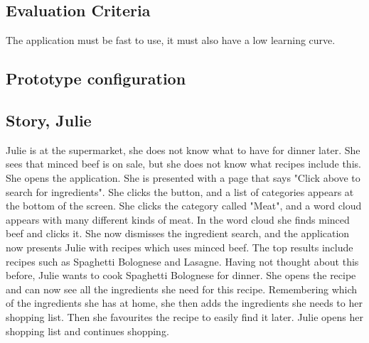 \subsection*{Evaluation Criteria}

The application must be fast to use, it must also have a low learning curve.

\subsection*{Prototype configuration}

\subsection*{Story, Julie}

Julie is at the supermarket, she does not know what to have for dinner later. She sees that minced beef is on sale, but she does not know what recipes include this. She opens the application. She is presented with a page that says "Click above to search for ingredients". She clicks the button, and a list of categories appears at the bottom of the screen. She clicks the category called "Meat", and a word cloud appears with many different kinds of meat. In the word cloud she finds minced beef and clicks it. She now dismisses the ingredient search, and the application now presents Julie with recipes which uses minced beef. The top results include recipes such as Spaghetti Bolognese and Lasagne. Having not thought about this before, Julie wants to cook Spaghetti Bolognese for dinner. She opens the recipe and can now see all the ingredients she need for this recipe. Remembering which of the ingredients she has at home, she then adds the ingredients she needs to her shopping list. Then she favourites the recipe to easily find it later. Julie opens her shopping list and continues shopping.


